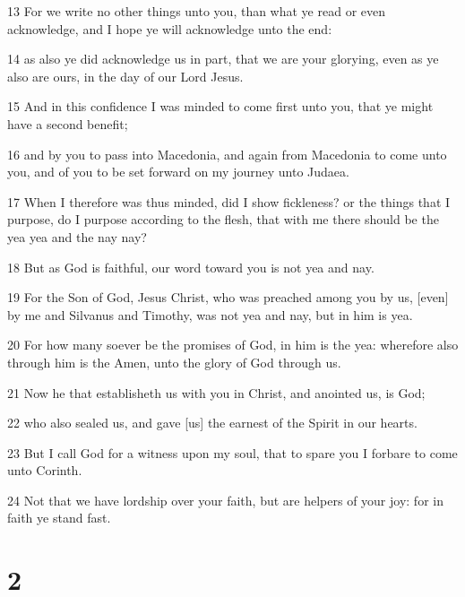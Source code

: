 \par 13 For we write no other things unto you, than what ye read or even acknowledge, and I hope ye will acknowledge unto the end:
\par 14 as also ye did acknowledge us in part, that we are your glorying, even as ye also are ours, in the day of our Lord Jesus.
\par 15 And in this confidence I was minded to come first unto you, that ye might have a second benefit;
\par 16 and by you to pass into Macedonia, and again from Macedonia to come unto you, and of you to be set forward on my journey unto Judaea.
\par 17 When I therefore was thus minded, did I show fickleness? or the things that I purpose, do I purpose according to the flesh, that with me there should be the yea yea and the nay nay?
\par 18 But as God is faithful, our word toward you is not yea and nay.
\par 19 For the Son of God, Jesus Christ, who was preached among you by us, [even] by me and Silvanus and Timothy, was not yea and nay, but in him is yea.
\par 20 For how many soever be the promises of God, in him is the yea: wherefore also through him is the Amen, unto the glory of God through us.
\par 21 Now he that establisheth us with you in Christ, and anointed us, is God;
\par 22 who also sealed us, and gave [us] the earnest of the Spirit in our hearts.
\par 23 But I call God for a witness upon my soul, that to spare you I forbare to come unto Corinth.
\par 24 Not that we have lordship over your faith, but are helpers of your joy: for in faith ye stand fast.

\chapter{2}

